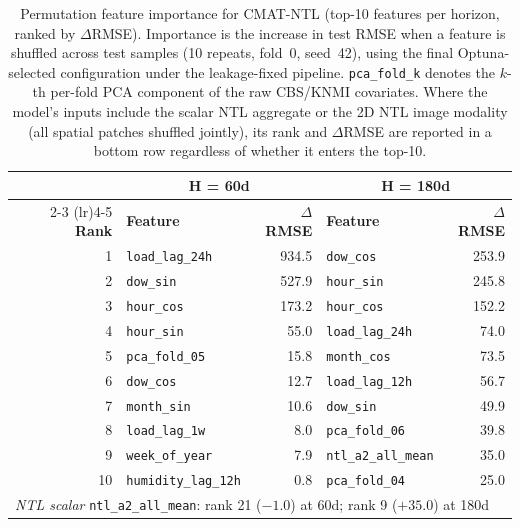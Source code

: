 \begin{table}[h]
\centering
\scriptsize
\caption{Permutation feature importance for CMAT-NTL (top-10
features per horizon, ranked by $\Delta$RMSE). Importance is the increase in
test RMSE when a feature is shuffled across test samples (10 repeats, fold~0,
seed~42), using the final Optuna-selected configuration under the
leakage-fixed pipeline. \texttt{pca\_fold\_k} denotes the $k$-th per-fold PCA
component of the raw CBS/KNMI covariates. Where the model's inputs include the scalar NTL aggregate or the 2D NTL image modality (all spatial patches shuffled jointly), its rank and $\Delta$RMSE are reported in a bottom row regardless of whether it enters the top-10.}
\label{tab:feat_imp_ntl}
\begin{tabular}{r l r l r }
\toprule
 & \multicolumn{2}{c}{\textbf{H = 60d}} & \multicolumn{2}{c}{\textbf{H = 180d}} \\
\cmidrule(lr){2-3} \cmidrule(lr){4-5}
\textbf{Rank} & \textbf{Feature} & \textbf{$\Delta$RMSE} & \textbf{Feature} & \textbf{$\Delta$RMSE} \\
\midrule
1 & \texttt{load\_lag\_24h} & 934.5 & \texttt{dow\_cos} & 253.9 \\
2 & \texttt{dow\_sin} & 527.9 & \texttt{hour\_sin} & 245.8 \\
3 & \texttt{hour\_cos} & 173.2 & \texttt{hour\_cos} & 152.2 \\
4 & \texttt{hour\_sin} & 55.0 & \texttt{load\_lag\_24h} & 74.0 \\
5 & \texttt{pca\_fold\_05} & 15.8 & \texttt{month\_cos} & 73.5 \\
6 & \texttt{dow\_cos} & 12.7 & \texttt{load\_lag\_12h} & 56.7 \\
7 & \texttt{month\_sin} & 10.6 & \texttt{dow\_sin} & 49.9 \\
8 & \texttt{load\_lag\_1w} & 8.0 & \texttt{pca\_fold\_06} & 39.8 \\
9 & \texttt{week\_of\_year} & 7.9 & \texttt{ntl\_a2\_all\_mean} & 35.0 \\
10 & \texttt{humidity\_lag\_12h} & 0.8 & \texttt{pca\_fold\_04} & 25.0 \\
\midrule
\multicolumn{5}{l}{\textit{NTL scalar} \texttt{ntl\_a2\_all\_mean}: rank 21 (${-}1.0$) at 60d;\; rank 9 (${+}35.0$) at 180d} \\
\bottomrule
\end{tabular}
\end{table}

